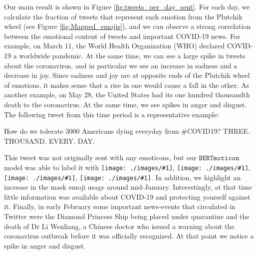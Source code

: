 \documentclass[11pt]{article}
\newcommand{\bertmoji}{\texttt{BERTmoticon}}
\newcommand{\emoji}[1]{\texttt{[image: ./images/\#1]}}
\DeclareMathOperator{\emoticon}{\texttt{TwitterEmoticon}}
\DeclareMathOperator{\corona}{\texttt{TwitterCOVID}}
\begin{document}
Our main result is shown in Figure \ref{fig:tweets_per_day_sent}.
For each day, we calculate the fraction of tweets that represent each emotion from the Plutchik wheel (see Figure \ref{fig:Mapped_emojis}),
and we can observe a strong correlation between the emotional content of tweets and important COVID-19 news.
For example, on March 11, the World Health Organization (WHO) declared COVID-19 a worldwide pandemic.
At the same time, we can see a large spike in tweets about the coronavirus,
and in particular we see an increase in sadness and a decrease in joy.
Since sadness and joy are at opposite ends of the Plutchik wheel of emotions,
it makes sense that a rise in one would cause a fall in the other.
As another example, on May 28, the United States had its one hundred thousandth death to the coronavirus.
At the same time, we see spikes in anger and disgust.
The following tweet from this time period is a representative example:
\begin{displayquote}
    How do we tolerate 3000 Americans dying everyday from \#COVID19? THREE. THOUSAND. EVERY. DAY.
\end{displayquote}
This tweet was not originally sent with any emoticons,
but our $\bertmoji$ model was able to label it with \emoji{1f620}, \emoji{mask_photo}, \emoji{1f644}, \emoji{1f62d}. In addition, we highlight an increase in the mask emoji usage around mid-January. Interestingly, at that time little information was available about COVID-19 and protecting yourself against it. Finally, in early February some important news-events that circulated in Twitter were the Diamond Princess Ship being placed under quarantine and the death of Dr Li Wenliang, a Chinese doctor who issued a warning about the coronavirus outbreak before it was officially recognized. At that point we notice a spike in anger and disgust.

\end{document}
